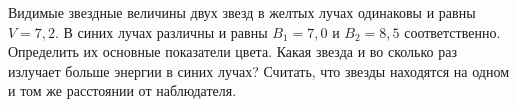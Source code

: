 Видимые звездные величины двух звезд в желтых лучах одинаковы и
равны $V = 7{,}2$. В синих лучах различны и равны $B_1 = 7{,}0$ и
$B_2 = 8{,}5$ соответственно. Определить их основные показатели цвета. Какая
звезда и во сколько раз излучает больше энергии в синих лучах? Считать, что
звезды находятся на одном и том же расстоянии от наблюдателя.
